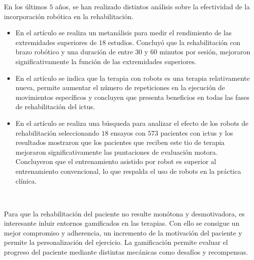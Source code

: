En los últimos $5$ años, se han realizado distintos análisis sobre la efectividad de la incorporación robótica en la rehabilitación.

\begin{itemize}
	\item En el artículo \cite{perales4a} se realiza un metanálisis para medir el rendimiento de las extremidades superiores de $18$ estudios. Concluyó que la rehabilitación con brazo robótico y una duración de entre $30$ y $60$ minutos por sesión, mejoraron significativamente la función de las extremidades superiores.
	\item En el artículo \cite{perales4b} se indica que la terapia con robots es una terapia relativamente nueva, permite aumentar el número de repeticiones en la ejecución de movimientos específicos y concluyen que presenta beneficios en todas las fases de rehabilitación del ictus.
	\item En el artículo \cite{perales4c} se realiza una búsqueda para analizar el efecto de los robots de rehabilitación seleccionando $18$ ensayos con $573$ pacientes con ictus y los resultados mostraron que los pacientes que reciben este tio de terapia mejoraron significativamente las puntaciones de evaluación motora. Concluyeron que el entrenamiento asistido por robot es superior al entrenamiento convencional, lo que respalda el uso de robots en la práctica clínica.
\end{itemize}\

Para que la rehabilitación del paciente no resulte monótona y desmotivadora, es interesante inluir entornos gamificados en las terapias.
Con ello se consigue un mejor compromiso y adherencia, un incremento de la motivación del paciente y permite la personalización del ejercicio.
La gamificación permite evaluar el progreso del paciente mediante distintas mecánicas como desafíos y recompensas.
